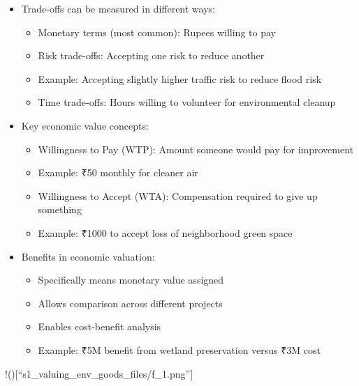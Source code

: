\documentclass[
  ignorenonframetext,
]{beamer}
\providecommand{\tightlist}{%
  \setlength{\itemsep}{0pt}\setlength{\parskip}{0pt}}\usepackage{longtable,booktabs,array}
\begin{document}
\begin{frame}
\begin{itemize}
\tightlist
\item
  Trade-offs can be measured in different ways:

  \begin{itemize}
  \tightlist
  \item
    Monetary terms (most common): Rupees willing to pay
  \item
    Risk trade-offs: Accepting one risk to reduce another
  \item
    Example: Accepting slightly higher traffic risk to reduce flood risk
  \item
    Time trade-offs: Hours willing to volunteer for environmental
    cleanup
  \end{itemize}
\item
  Key economic value concepts:

  \begin{itemize}
  \tightlist
  \item
    Willingness to Pay (WTP): Amount someone would pay for improvement
  \item
    Example: ₹50 monthly for cleaner air
  \item
    Willingness to Accept (WTA): Compensation required to give up
    something
  \item
    Example: ₹1000 to accept loss of neighborhood green space
  \end{itemize}
\item
  Benefits in economic valuation:

  \begin{itemize}
  \tightlist
  \item
    Specifically means monetary value assigned
  \item
    Allows comparison across different projects
  \item
    Enables cost-benefit analysis
  \item
    Example: ₹5M benefit from wetland preservation versus ₹3M cost
  \end{itemize}
\end{itemize}
\end{frame}

\begin{frame}
!(){[}``s1\_valuing\_env\_goods\_files/f\_1.png''{]}
\end{frame}
\end{document}
